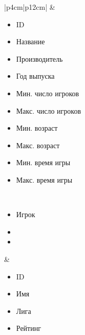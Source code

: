 \begin{table}[h!]
\begin{center}
\begin{threeparttable}
\begin{tabular}{|p{4cm}|p{12cm}|}
          & \begin{minipage}[t]{\linewidth}
              \begin{multicols}{2}
                \begin{itemize}[leftmargin=0mm,labelsep=0mm,nosep,after=\strut]
                  \item[] ID
                  \item[] Название
                  \item[] Производитель
                  \item[] Год выпуска
                  \item[] Мин. число игроков
                  \item[] Макс. число игроков
                  \item[] Мин. возраст
                  \item[] Макс. возраст
                  \item[] Мин. время игры
                  \item[] Макс. время игры
                \end{itemize}
              \end{multicols}
            \end{minipage}\\
            \hline
            \begin{minipage}[t]{\linewidth}
              \begin{multicols}{1}
                \begin{itemize}[leftmargin=0mm,labelsep=0mm,nosep,after=\strut]
                  \item[] Игрок
                  \item[]
                  \item[]
                \end{itemize}
              \end{multicols}
            \end{minipage}
          & \begin{minipage}[t]{\linewidth}
              \begin{multicols}{2}
                \begin{itemize}[leftmargin=0mm,labelsep=0mm,nosep,after=\strut]
                  \item[] ID
                  \item[] Имя
                  \item[] Лига
                  \item[] Рейтинг
                \end{itemize}

\end{multicols}
\end{minipage}
\end{tabular}
\end{threeparttable}
\end{center}
\end{table}
